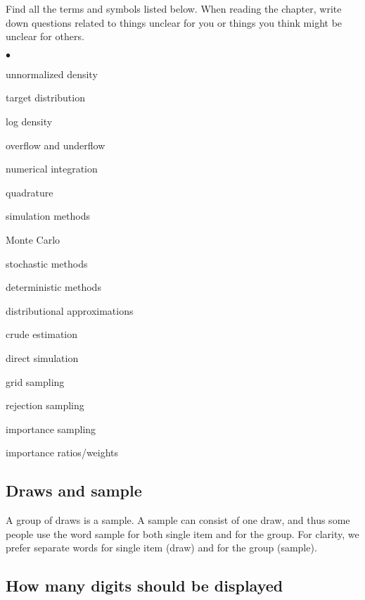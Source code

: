 \documentclass[a4paper,11pt,english]{article}
\begin{document}
Find all the terms and symbols listed below. When reading the chapter,
write down questions related to things unclear for you or things you
think might be unclear for others. 
\begin{list}{$\bullet$}{\parsep=0pt\itemsep=2pt}
\item unnormalized density
\item target distribution
\item log density
\item overflow and underflow
\item numerical integration
\item quadrature
\item simulation methods
\item Monte Carlo
\item stochastic methods
\item deterministic methods
\item distributional approximations
\item crude estimation
\item direct simulation
\item grid sampling
\item rejection sampling
\item importance sampling
\item importance ratios/weights
\end{list}

 \subsection*{Draws and sample}

 A group of draws is a sample. A sample can consist of one draw, and
 thus some people use the word sample for both single item and for the
 group. For clarity, we prefer separate words for single item (draw)
 and for the group (sample).
 
  \subsection*{How many digits should be displayed}
\end{document}
